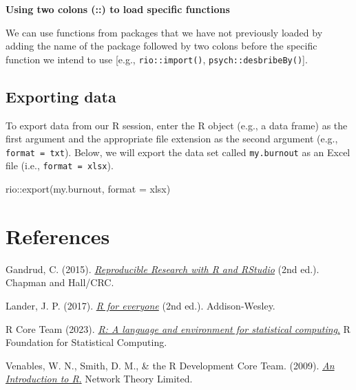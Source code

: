 \documentclass[
]{book}
\newenvironment{Shaded}{\begin{snugshade}}{\end{snugshade}}
\newcommand{\AttributeTok}[1]{\textcolor[rgb]{0.77,0.63,0.00}{#1}}
\newcommand{\FunctionTok}[1]{\textcolor[rgb]{0.00,0.00,0.00}{#1}}
\newcommand{\NormalTok}[1]{#1}
\newcommand{\SpecialCharTok}[1]{\textcolor[rgb]{0.00,0.00,0.00}{#1}}
\newcommand{\StringTok}[1]{\textcolor[rgb]{0.31,0.60,0.02}{#1}}
\theoremstyle{definition}
\theoremstyle{definition}
\theoremstyle{definition}
\theoremstyle{definition}
\theoremstyle{remark}
\begin{document}
\textbf{Using two colons (::) to load specific functions}

We can use functions from packages that we have not previously loaded by adding the name of the package followed by two colons before the specific function we intend to use {[}e.g., \texttt{rio::import()}, \texttt{psych::desbribeBy()}{]}.

\hypertarget{exporting-data}{%
\subsection{Exporting data}\label{exporting-data}}

To export data from our R session, enter the R object (e.g., a data frame) as the first argument and the appropriate file extension as the second argument (e.g., \texttt{format\ =\ \textquotesingle{}txt\textquotesingle{}}). Below, we will export the data set called \texttt{my.burnout} as an Excel file (i.e., \texttt{format\ =\ \textquotesingle{}xlsx\textquotesingle{}}).

\begin{Shaded}
\begin{Highlighting}[]

\NormalTok{rio}\SpecialCharTok{::}\FunctionTok{export}\NormalTok{(my.burnout, }\AttributeTok{format =} \StringTok{\textquotesingle{}xlsx\textquotesingle{}}\NormalTok{)}
\end{Highlighting}
\end{Shaded}

\newpage

\hypertarget{references-1}{%
\section{References}\label{references-1}}

Gandrud, C. (2015). \href{https://prism.librarymanagementcloud.co.uk/dmu/items/1039503}{\emph{Reproducible Research with R and RStudio}} (2nd ed.). Chapman and Hall/CRC.

Lander, J. P. (2017). \href{https://prism.librarymanagementcloud.co.uk/dmu/items/1039492}{\emph{R for everyone}} (2nd ed.). Addison-Wesley.

R Core Team (2023). \href{https://www.r-project.org}{\emph{R: A language and environment for statistical computing}.} R Foundation for Statistical Computing.

Venables, W. N., Smith, D. M., \& the R Development Core Team. (2009). \href{https://cran.r-project.org/doc/manuals/r-release/R-intro.pdf}{\emph{An Introduction to R}.} Network Theory Limited.
\end{document}
